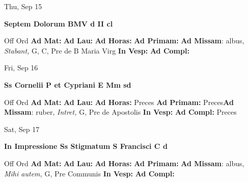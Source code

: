 \documentclass[10pt]{memoir}
\begin{document}
\begin{center}
\begin{minipage}{3.5in}
\vspace{2em}
\begin{center}Thu, Sep 15
\end{center}
\textbf{ \large Septem Dolorum BMV
\textnormal{\normalsize d II cl}}

\begin{justify}Off Ord
\textbf{Ad Mat: }
\textbf{Ad Lau: }
\textbf{Ad Horas: }
\textbf{Ad Primam: }\textbf{Ad Missam}: albus, \textit{Stabant,} G, C, Pre de B Maria Virg
\textbf{In Vesp: }
\textbf{Ad Compl: }
\end{justify}
\end{minipage}
\end{center}

\begin{center}
\begin{minipage}{3.5in}
\vspace{2em}
\begin{center}Fri, Sep 16
\end{center}
\textbf{ \large Ss Cornelii P et Cypriani E Mm
\textnormal{\normalsize sd}}

\begin{justify}Off Ord
\textbf{Ad Mat: }
\textbf{Ad Lau: }
\textbf{Ad Horas: }Preces
\textbf{Ad Primam: }Preces\textbf{Ad Missam}: ruber, \textit{Intret,} G, Pre de Apostolis
\textbf{In Vesp: }
\textbf{Ad Compl: }Preces
\end{justify}
\end{minipage}
\end{center}

\begin{center}
\begin{minipage}{3.5in}
\vspace{2em}
\begin{center}Sat, Sep 17
\end{center}
\textbf{ \large In Impressione Ss Stigmatum S Francisci C
\textnormal{\normalsize d}}

\begin{justify}Off Ord
\textbf{Ad Mat: }
\textbf{Ad Lau: }
\textbf{Ad Horas: }
\textbf{Ad Primam: }\textbf{Ad Missam}: albus, \textit{Mihi autem,} G, Pre Communis
\textbf{In Vesp: }
\textbf{Ad Compl: }
\end{justify}
\end{minipage}
\end{center}
\end{document}
